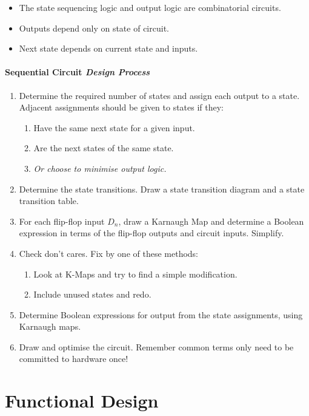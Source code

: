 \documentclass[twocolumn,english]{article}
\begin{document}
\begin{itemize}
\item The state sequencing logic and output logic are combinatorial circuits.
\item Outputs depend only on state of circuit.
\item Next state depends on current state and inputs.
\end{itemize}

\paragraph{Sequential Circuit \emph{Design Process}}
\begin{enumerate}
\item Determine the required number of states and assign each output to
a state. Adjacent assignments should be given to states if they:

\begin{enumerate}
\item Have the same next state for a given input.
\item Are the next states of the same state.
\item \emph{Or choose to minimise output logic.}
\end{enumerate}
\item Determine the state transitions. Draw a state transition diagram and
a state transition table.
\item For each flip-flop input $D_{n}$, draw a Karnaugh Map and determine
a Boolean expression in terms of the flip-flop outputs and circuit
inputs. Simplify.
\item Check don't cares. Fix by one of these methods:

\begin{enumerate}
\item Look at K-Maps and try to find a simple modification.
\item Include unused states and redo.
\end{enumerate}
\item Determine Boolean expressions for output from the state assignments,
using Karnaugh maps.
\item Draw and optimise the circuit. Remember common terms only need to
be committed to hardware once!
\end{enumerate}

\section{Functional Design}
\end{document}
